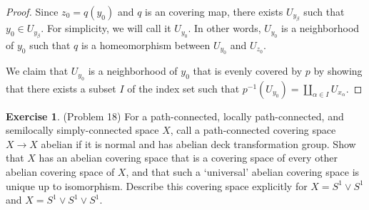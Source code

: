 \documentclass[12pt, psamsfonts]{amsart}
\theoremstyle{definition}
\newtheorem*{exer}{Exercise}
\theoremstyle{remark}
\numberwithin{equation}{section}
\begin{document}
\begin{proof}

  Since $z_0 = q(y_0)$ and $q$ is an covering map, there exists $U_{y_{\beta}}$ such that $y_0 \in U_{y_{\beta}}$.
  For simplicity, we will call it $U_{y_0}$.
  In other words, $U_{y_0}$ is a neighborhood of $y_0$ such that $q$ is a homeomorphism between $U_{y_0}$ and $U_{z_0}$.

  We claim that $U_{y_0}$ is a neighborhood of $y_0$ that is evenly covered by $p$ by showing that there exists a subset $I$ of the index set such that $p^{-1}(U_{y_0}) = \coprod_{\alpha \in I} U_{x_{\alpha}}$.



\end{proof}

\begin{exer}{(Problem 18)}
  For a path-connected, locally path-connected, and semilocally simply-connected space $X$, call a path-connected covering space $X \rightarrow X$ abelian if it is normal and has abelian deck transformation group.
  Show that $X$ has an abelian covering space that is a covering space of every other abelian covering space of $X$, and that such a `universal' abelian covering space is unique up to isomorphism.
  Describe this covering space explicitly for $X = S^1 \vee S^1$ and $X = S^1 \vee S^1 \vee S^1$.
\end{exer}
\end{document}
